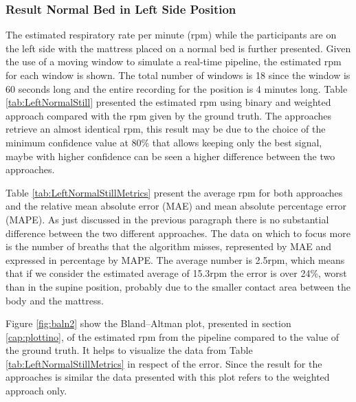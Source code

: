 \subsubsection{Result Normal Bed in Left Side Position}   \label{cap:ResultNormalBed2}

The estimated respiratory rate per minute (rpm) while the participants are on the left side with the mattress placed on a normal bed is further presented. Given the use of a moving window to simulate a real-time pipeline, the estimated rpm for each window is shown. 
The total number of windows is 18 since the window is 60 seconds long and the entire recording for the position is 4 minutes long. Table \ref{tab:LeftNormalStill} presented the estimated rpm using binary and weighted approach compared with the rpm given by the ground truth. The approaches retrieve an almost identical rpm, this result may be due to the choice of the minimum confidence value at 80\% that allows keeping only the best signal, maybe with higher confidence can be seen a higher difference between the two approaches. 

\vspace{1.3cm}
%


\vspace{0.5cm}

Table \ref{tab:LeftNormalStillMetrics} present the average rpm for both approaches  
and the relative mean absolute error (MAE) and mean absolute percentage error (MAPE). As just discussed in the previous paragraph there is no substantial difference between the two different approaches. The data on which to focus more is the number of breaths that the algorithm misses, represented by MAE and expressed in percentage by MAPE. The average number is 2.5rpm, which means that if we consider the estimated average of 15.3rpm the error is over 24\%, worst than in the supine position, probably due to the smaller contact area between the body and the mattress.

\vspace{1cm}

\vspace{0.5cm}

Figure \ref{fig:baln2} show the Bland–Altman plot, presented in section \ref{cap:plottino}, of the estimated rpm from the pipeline compared to the value of the ground truth. It helps to visualize the data from Table \ref{tab:LeftNormalStillMetrics} in respect of the error. Since the result for the approaches is similar the data presented with this plot refers to the weighted approach only.

